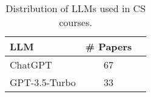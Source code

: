 \begin{table}[ht]
    \centering
    \caption{Distribution of LLMs used in CS courses.}
    \begin{tabular}{l c p{4cm}}
        \toprule
        \textbf{LLM} & \textbf{\# Papers} \\
        \midrule
		ChatGPT & 67 \\
		GPT-3.5-Turbo & 33 \\

\end{tabular}
\end{table}
